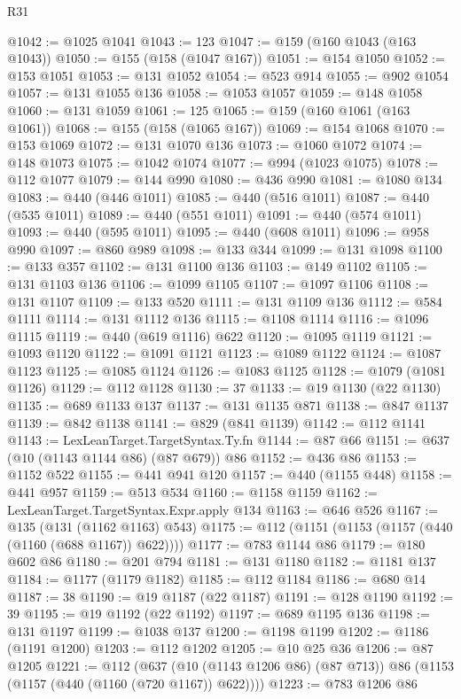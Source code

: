 \begin{lexlean}{R31}
\begin{coremodule}
@1042 := @1025 @1041
@1043 := 123
@1047 := @159 (@160 @1043 (@163 @1043))
@1050 := @155 (@158 (@1047 @167))
@1051 := @154 @1050
@1052 := @153 @1051
@1053 := @131 @1052
@1054 := @523 @914
@1055 := @902 @1054
@1057 := @131 @1055 @136
@1058 := @1053 @1057
@1059 := @148 @1058
@1060 := @131 @1059
@1061 := 125
@1065 := @159 (@160 @1061 (@163 @1061))
@1068 := @155 (@158 (@1065 @167))
@1069 := @154 @1068
@1070 := @153 @1069
@1072 := @131 @1070 @136
@1073 := @1060 @1072
@1074 := @148 @1073
@1075 := @1042 @1074
@1077 := @994 (@1023 @1075)
@1078 := @112 @1077
@1079 := @144 @990
@1080 := @436 @990
@1081 := @1080 @134
@1083 := @440 (@446 @1011)
@1085 := @440 (@516 @1011)
@1087 := @440 (@535 @1011)
@1089 := @440 (@551 @1011)
@1091 := @440 (@574 @1011)
@1093 := @440 (@595 @1011)
@1095 := @440 (@608 @1011)
@1096 := @958 @990
@1097 := @860 @989
@1098 := @133 @344
@1099 := @131 @1098
@1100 := @133 @357
@1102 := @131 @1100 @136
@1103 := @149 @1102
@1105 := @131 @1103 @136
@1106 := @1099 @1105
@1107 := @1097 @1106
@1108 := @131 @1107
@1109 := @133 @520
@1111 := @131 @1109 @136
@1112 := @584 @1111
@1114 := @131 @1112 @136
@1115 := @1108 @1114
@1116 := @1096 @1115
@1119 := @440 (@619 @1116) @622
@1120 := @1095 @1119
@1121 := @1093 @1120
@1122 := @1091 @1121
@1123 := @1089 @1122
@1124 := @1087 @1123
@1125 := @1085 @1124
@1126 := @1083 @1125
@1128 := @1079 (@1081 @1126)
@1129 := @112 @1128
@1130 := 37
@1133 := @19 @1130 (@22 @1130)
@1135 := @689 @1133 @137
@1137 := @131 @1135 @871
@1138 := @847 @1137
@1139 := @842 @1138
@1141 := @829 (@841 @1139)
@1142 := @112 @1141
@1143 := LexLeanTarget.TargetSyntax.Ty.fn
@1144 := @87 @66
@1151 := @637 (@10 (@1143 @1144 @86) (@87 @679)) @86
@1152 := @436 @86
@1153 := @1152 @522
@1155 := @441 @941 @120
@1157 := @440 (@1155 @448)
@1158 := @441 @957
@1159 := @513 @534
@1160 := @1158 @1159
@1162 := LexLeanTarget.TargetSyntax.Expr.apply @134
@1163 := @646 @526
@1167 := @135 (@131 (@1162 @1163) @543)
@1175 := @112 (@1151 (@1153 (@1157 (@440 (@1160 (@688 @1167)) @622))))
@1177 := @783 @1144 @86
@1179 := @180 @602 @86
@1180 := @201 @794
@1181 := @131 @1180
@1182 := @1181 @137
@1184 := @1177 (@1179 @1182)
@1185 := @112 @1184
@1186 := @680 @14
@1187 := 38
@1190 := @19 @1187 (@22 @1187)
@1191 := @128 @1190
@1192 := 39
@1195 := @19 @1192 (@22 @1192)
@1197 := @689 @1195 @136
@1198 := @131 @1197
@1199 := @1038 @137
@1200 := @1198 @1199
@1202 := @1186 (@1191 @1200)
@1203 := @112 @1202
@1205 := @10 @25 @36
@1206 := @87 @1205
@1221 := @112
    (@637 (@10 (@1143 @1206 @86) (@87 @713)) @86 (@1153 (@1157 (@440 (@1160 (@720 @1167)) @622))))
@1223 := @783 @1206 @86

\end{coremodule}
\end{lexlean}
